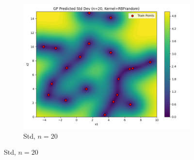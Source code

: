 \documentclass[a4paper,12pt]{article}
\begin{document}
\begin{figure}[H]
\begin{subfigure}{0.3\textwidth}
    \includegraphics[width=\linewidth]{Task-02/images/gp_std_rbf_n20_random.png}
    \caption{Std, $n=20$}
\end{subfigure}


\end{figure}
\end{document}
